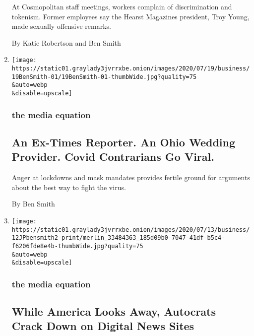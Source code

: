 \begin{enumerate}
  At Cosmopolitan staff meetings, workers complain of discrimination and
  tokenism. Former employees say the Hearst Magazines president, Troy
  Young, made sexually offensive remarks.

  By Katie Robertson and Ben Smith
\item
  \href{/2020/07/19/business/media/coronavirus-contrarians-lockdowns-masks.html}{}

  \texttt{[image: https://static01.graylady3jvrrxbe.onion/images/2020/07/19/business/19BenSmith-01/19BenSmith-01-thumbWide.jpg?quality=75\\\&auto=webp\\\&disable=upscale]}

  \hypertarget{the-media-equation-2}{%
  \subsubsection{the media equation}\label{the-media-equation-2}}

  \hypertarget{an-ex-times-reporter-an-ohio-wedding-provider-covid-contrarians-go-viral}{%
  \subsection{An Ex-Times Reporter. An Ohio Wedding Provider. Covid
  Contrarians Go
  Viral.}\label{an-ex-times-reporter-an-ohio-wedding-provider-covid-contrarians-go-viral}}

  Anger at lockdowns and mask mandates provides fertile ground for
  arguments about the best way to fight the virus.

  By Ben Smith
\item
  \href{/2020/07/12/business/media/freedom-digital-news-sites-autocrats.html}{}

  \texttt{[image: https://static01.graylady3jvrrxbe.onion/images/2020/07/13/business/12JPbensmith2-print/merlin\_33484363\_185d09b0-7047-41df-b5c4-f6206fde8e4b-thumbWide.jpg?quality=75\\\&auto=webp\\\&disable=upscale]}

  \hypertarget{the-media-equation-3}{%
  \subsubsection{the media equation}\label{the-media-equation-3}}

  \hypertarget{while-america-looks-away-autocrats-crack-down-on-digital-news-sites}{%
  \subsection{While America Looks Away, Autocrats Crack Down on Digital
  News
  Sites}\label{while-america-looks-away-autocrats-crack-down-on-digital-news-sites}}


\end{enumerate}
